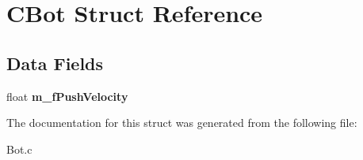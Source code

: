 \hypertarget{struct_c_bot}{}\section{C\+Bot Struct Reference}
\label{struct_c_bot}
\subsection*{Data Fields}
\begin{DoxyCompactItemize}
\item 
\mbox{\label{struct_c_bot_aff9b6a21c21e1753bd145be0d6455c44}} 
float {\bfseries m\+\_\+f\+Push\+Velocity}
\end{DoxyCompactItemize}


The documentation for this struct was generated from the following file\+:\begin{DoxyCompactItemize}
\item 
Bot.\+c\end{DoxyCompactItemize}

